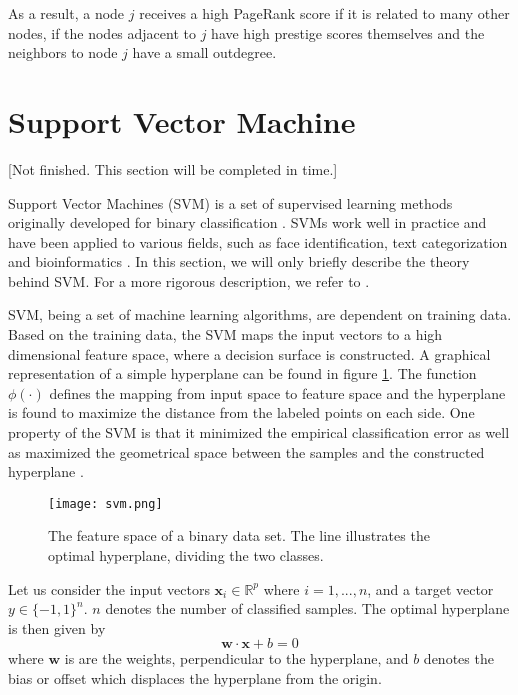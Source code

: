 As a result, a node $j$ receives a high PageRank score if it is related to many other nodes, if the nodes adjacent to $j$ have high prestige scores themselves and the neighbors to node $j$ have a small outdegree. 


\section{Support Vector Machine}
[Not finished. This section will be completed in time.]

Support Vector Machines (SVM) is a set of supervised learning methods originally developed for binary classification \citep{Hsu2002}. SVMs work well in practice and have been applied to various fields, such as face identification, text categorization and bioinformatics \citep{campbell2011}. In this section, we will only briefly describe the theory behind SVM. For a more rigorous description, we refer to \citep{Kecman2005,Cortes1995,campbell2011}.

SVM, being a set of machine learning algorithms, are dependent on training data. Based on the training data, the SVM maps the input vectors to a high dimensional feature space, where a decision surface is constructed. A graphical representation of a simple hyperplane can be found in figure \ref{svm}. The function $\phi(\cdot)$ defines the mapping from input space to feature space and the hyperplane is found to maximize the distance from the labeled points on each side. One property of the SVM is that it minimized the empirical classification error as well as maximized the geometrical space between the samples and the constructed hyperplane \citep{Cortes1995}.

\begin{figure}[h!]
    \centering
    \texttt{[image: svm.png]}
    \caption{The feature space of a binary data set. The line illustrates the optimal hyperplane, dividing the two classes.}
    \label{svm}
\end{figure}

Let us consider the input vectors $\bm{x}_i\in \mathds{R}^p$ where $i=1,...,n$, and a target vector $y \in \{-1,1\}^n$. $n$ denotes the number of classified samples. The optimal hyperplane is then given by
\begin{equation}
    \bm{w}\cdot\bm{x}+b=0
\end{equation}
where $\bm{w}$ is are the weights, perpendicular to the hyperplane, and $b$ denotes the bias or offset which displaces the hyperplane from the origin.

